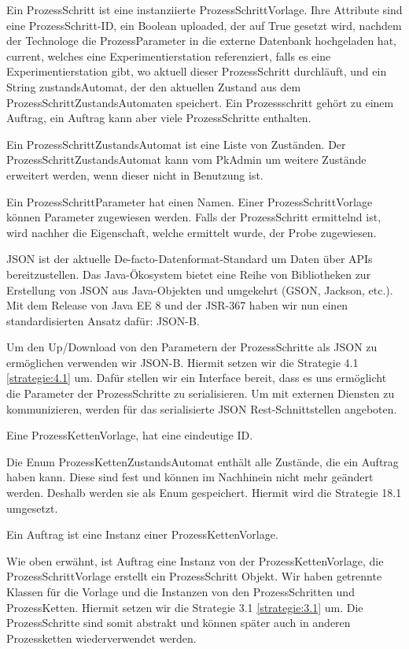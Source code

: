 \documentclass[enabledeprecatedfontcommands,fontsize=12pt,paper=a4,twoside]{scrartcl}
\begin{document}
{Ein ProzessSchritt ist eine instanziierte ProzessSchrittVorlage. Ihre Attribute
sind eine ProzessSchritt-ID, ein Boolean uploaded, der auf True gesetzt wird,
nachdem der Technologe die ProzessParameter in die externe Datenbank hochgeladen
hat, current, welches eine Experimentierstation referenziert, falls es eine
Experimentierstation gibt, wo aktuell dieser ProzessSchritt durchläuft, und ein String zustandsAutomat, der den aktuellen Zustand aus dem ProzessSchrittZustandsAutomaten speichert. Ein Prozessschritt gehört zu einem Auftrag, ein Auftrag
kann aber viele ProzessSchritte enthalten.

Ein ProzessSchrittZustandsAutomat ist eine Liste von Zuständen. Der
ProzessSchrittZustandsAutomat kann vom PkAdmin um weitere Zustände erweitert
werden, wenn dieser nicht in Benutzung ist.

Ein ProzessSchrittParameter hat einen Namen. Einer ProzessSchrittVorlage können
Parameter zugewiesen werden. Falls der ProzessSchritt ermittelnd ist, wird
nachher die Eigenschaft, welche ermittelt wurde, der Probe zugewiesen.

JSON ist der aktuelle De-facto-Datenformat-Standard um Daten über APIs bereitzustellen. Das Java-Ökosystem bietet eine Reihe von Bibliotheken zur Erstellung von JSON aus Java-Objekten und umgekehrt (GSON, Jackson, etc.). Mit dem Release von Java EE 8 und der JSR-367 haben wir nun einen standardisierten Ansatz dafür: JSON-B.

Um den Up/Download von den Parametern der ProzessSchritte als JSON zu ermöglichen verwenden wir JSON-B. Hiermit setzen wir die Strategie 4.1 \ref{strategie:4.1}  um. Dafür stellen wir ein Interface
bereit, dass es uns ermöglicht die Parameter der ProzessSchritte zu serialisieren.
Um mit externen Diensten zu kommunizieren, werden für das serialisierte JSON
Rest-Schnittstellen angeboten.

Eine ProzessKettenVorlage, hat eine eindeutige ID. 


Die Enum ProzessKettenZustandsAutomat enthält alle Zustände, die ein Auftrag
haben kann. Diese sind fest und können im Nachhinein nicht mehr geändert werden.
Deshalb werden sie als Enum gespeichert. Hiermit wird die Strategie 18.1 umgesetzt.

Ein Auftrag ist eine Instanz einer ProzessKettenVorlage.

Wie oben erwähnt, ist Auftrag eine Instanz von der ProzessKettenVorlage, die
ProzessSchrittVorlage erstellt ein ProzessSchritt Objekt. Wir haben getrennte
Klassen für die Vorlage und die Instanzen von den ProzessSchritten und ProzessKetten.
Hiermit setzen wir die Strategie 3.1 \ref{strategie:3.1}  um. Die ProzessSchritte sind somit abstrakt
und können später auch in anderen Prozessketten wiederverwendet werden.

}
\end{document}
